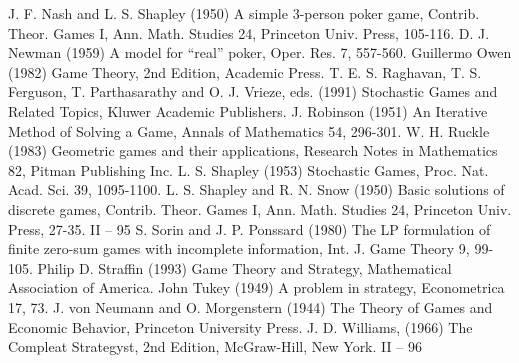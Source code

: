 J. F. Nash and L. S. Shapley (1950) A simple 3-person poker game, Contrib. Theor. Games
I, Ann. Math. Studies 24, Princeton Univ. Press, 105-116.
D. J. Newman (1959) A model for “real” poker, Oper. Res. 7, 557-560.
Guillermo Owen (1982) Game Theory, 2nd Edition, Academic Press.
T. E. S. Raghavan, T. S. Ferguson, T. Parthasarathy and O. J. Vrieze, eds. (1991) Stochastic
Games and Related Topics, Kluwer Academic Publishers.
J. Robinson (1951) An Iterative Method of Solving a Game, Annals of Mathematics 54,
296-301.
W. H. Ruckle (1983) Geometric games and their applications, Research Notes in Mathematics
82, Pitman Publishing Inc.
L. S. Shapley (1953) Stochastic Games, Proc. Nat. Acad. Sci. 39, 1095-1100.
L. S. Shapley and R. N. Snow (1950) Basic solutions of discrete games, Contrib. Theor.
Games I, Ann. Math. Studies 24, Princeton Univ. Press, 27-35.
II – 95
S. Sorin and J. P. Ponssard (1980) The LP formulation of finite zero-sum games with
incomplete information, Int. J. Game Theory 9, 99-105.
Philip D. Straffin (1993) Game Theory and Strategy, Mathematical Association of America.
John Tukey (1949) A problem in strategy, Econometrica 17, 73.
J. von Neumann and O. Morgenstern (1944) The Theory of Games and Economic Behavior,
Princeton University Press.
J. D. Williams, (1966) The Compleat Strategyst, 2nd Edition, McGraw-Hill, New York.
II – 96
